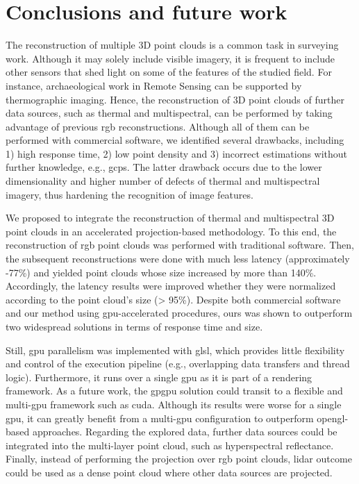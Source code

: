 \section{Conclusions and future work}

The reconstruction of multiple 3D point clouds is a common task in surveying work. Although it may solely include visible imagery, it is frequent to include other sensors that shed light on some of the features of the studied field. For instance, archaeological work in Remote Sensing can be supported by thermographic imaging. Hence, the reconstruction of 3D point clouds of further data sources, such as thermal and multispectral, can be performed by taking advantage of previous \acrshort{rgb} reconstructions. Although all of them can be performed with commercial software, we identified several drawbacks, including 1) high response time, 2) low point density and 3) incorrect estimations without further knowledge, e.g., \acrshort{gcp}s. The latter drawback occurs due to the lower dimensionality and higher number of defects of thermal and multispectral imagery, thus hardening the recognition of image features.

We proposed to integrate the reconstruction of thermal and multispectral 3D point clouds in an accelerated projection-based methodology. To this end, the reconstruction of \acrshort{rgb} point clouds was performed with traditional software. Then, the subsequent reconstructions were done with much less latency (approximately -77\%) and yielded point clouds whose size increased by more than 140\%. Accordingly, the latency results were improved whether they were normalized according to the point cloud's size (> 95\%). Despite both commercial software and our method using \acrshort{gpu}-accelerated procedures, ours was shown to outperform two widespread solutions in terms of response time and size. 

Still, \acrshort{gpu} parallelism was implemented with \acrshort{glsl}, which provides little flexibility and control of the execution pipeline (e.g., overlapping data transfers and thread logic). Furthermore, it runs over a single \acrshort{gpu} as it is part of a rendering framework. As a future work, the \acrshort{gpgpu} solution could transit to a flexible and multi-\acrshort{gpu} framework such as \acrshort{cuda}. Although its results were worse for a single \acrshort{gpu}, it can greatly benefit from a multi-\acrshort{gpu} configuration to outperform \acrshort{opengl}-based approaches. Regarding the explored data, further data sources could be integrated into the multi-layer point cloud, such as hyperspectral reflectance. Finally, instead of performing the projection over \acrshort{rgb} point clouds, \acrshort{lidar} outcome could be used as a dense point cloud where other data sources are projected.  


